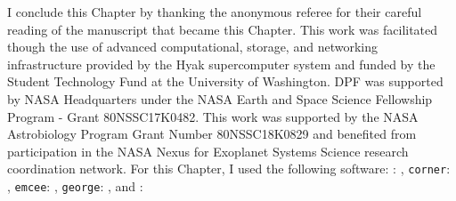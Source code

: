 I conclude this Chapter by thanking the anonymous referee for their careful reading of the manuscript that became this Chapter. This work was facilitated though the use of advanced computational, storage, and networking infrastructure provided by the Hyak supercomputer system and funded by the Student Technology Fund at the University of Washington. DPF was supported by NASA Headquarters under the NASA Earth and Space Science Fellowship Program - Grant 80NSSC17K0482.  This work was supported by the NASA Astrobiology Program Grant Number 80NSSC18K0829 and benefited from participation in the NASA Nexus for Exoplanet Systems Science research coordination network. For this Chapter, I used the following software: \approxposterior: \citet{FlemingVanderPlas2018}, \texttt{corner}: \citet{ForemanMackey2016}, \texttt{emcee}: \citet{ForemanMackey2013}, \texttt{george}: \citet{george}, and \vplanet: \citet{Barnes2019}
